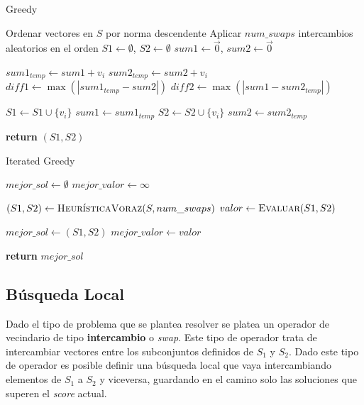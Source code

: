 \documentclass[12pt,letterpaper]{article}
\begin{document}
\begin{algorithm}[htp]
    \caption{Greedy}
    \begin{algorithmic}[1]
        \State Ordenar vectores en $S$ por norma descendente
        \State Aplicar $num\_swaps$ intercambios aleatorios en el orden
        \State $S1 \gets \emptyset$, $S2 \gets \emptyset$
        \State $sum1 \gets \vec{0}$, $sum2 \gets \vec{0}$

        \State $sum1_{temp} \gets sum1 + v_i$
        \State $sum2_{temp} \gets sum2 + v_i$
        \State $diff1 \gets \max(|sum1_{temp} - sum2|)$
        \State $diff2 \gets \max(|sum1 - sum2_{temp}|)$

        \State $S1 \gets S1 \cup \{v_i\}$
        \State $sum1 \gets sum1_{temp}$
        \Else
        \State $S2 \gets S2 \cup \{v_i\}$
        \State $sum2 \gets sum2_{temp}$
        \EndIf
        \EndFor

        \State \textbf{return} $(S1, S2)$
        \EndProcedure
    \end{algorithmic}
\end{algorithm}

\begin{algorithm}[htp]
    \caption{Iterated Greedy}
    \begin{algorithmic}[1]
        \State $mejor\_sol \gets \emptyset$
        \State $mejor\_valor \gets \infty$

        \State $(S1, S2) \gets \textsc{HeurísticaVoraz}(S, num\_swaps)$
        \State $valor \gets \textsc{Evaluar}(S1, S2)$

        \State $mejor\_sol \gets (S1, S2)$
        \State $mejor\_valor \gets valor$
        \EndIf
        \EndFor

        \State \textbf{return} $mejor\_sol$
        \EndProcedure
    \end{algorithmic}
\end{algorithm}


\subsection{Búsqueda Local}
Dado el tipo de problema que se plantea resolver se platea un operador de vecindario de tipo \textbf{intercambio} o \textit{swap}. Este tipo de operador trata de intercambiar vectores entre los subconjuntos definidos de $S_1$ y $S_2$.
Dado este tipo de operador es posible definir una búsqueda local que vaya intercambiando elementos de $S_1$ a $S_2$ y viceversa, guardando en el camino solo las soluciones que superen el \textit{score} actual.
\end{document}
